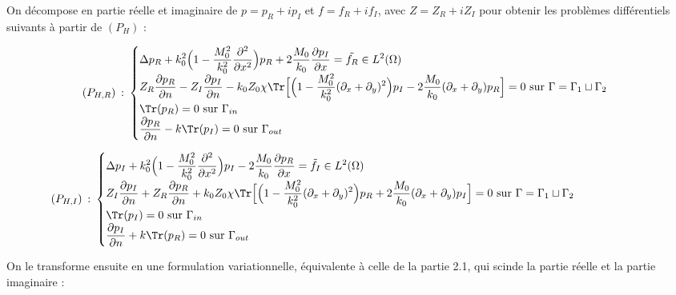 \begin{tcolorbox}[colback=red!5!white,colframe=red!75!black,title=Proposition 6.2.1 : Décomposition du problème différentiel]
On décompose en partie réelle et imaginaire de $p = p_R + ip_I$ et $f = f_R + if_I$, avec $Z=Z_R + iZ_I$ pour obtenir les problèmes différentiels suivants à partir de $(P_H)$ :

\[
    (P_{H,R}) \hspace{2pt} : \hspace{2pt}
    \begin{cases}
    \displaystyle \Delta p_R + k_0^2\Big(1 - \frac{M_0^2}{k_0^2}\frac{\partial^2}{\partial x^2}\Big)p_R+2\frac{M_0}{k_0}\frac{\partial p_I}{\partial x} = \Tilde{f_R} \in L^2(\Omega)\\
    \displaystyle Z_R\frac{\partial p_R}{\partial n} -Z_I\frac{\partial p_I}{\partial n} -k_0Z_0\chi \Tr \Bigl[\Big(1-\frac{M_0^2}{k_0^2}(\partial_x+\partial_y)^2\Big)p_I-2\frac{M_0}{k_0}(\partial_x+\partial_y)p_R \Bigr] = 0$ sur $\Gamma = \Gamma_1 \sqcup \Gamma_2
    \\
    \displaystyle \Tr(p_R) = 0 $ sur $ \Gamma_{in}\\
    \displaystyle \frac{\partial p_R}{\partial n}-k \Tr(p_I) = 0 $ sur $\Gamma_{out}
    \end{cases} 
\]

\[
    (P_{H,I}) \hspace{2pt} : \hspace{2pt}
    \begin{cases}
    \displaystyle \Delta p_I + k_0^2\Big(1 - \frac{M_0^2}{k_0^2}\frac{\partial^2}{\partial x^2}\Big)p_I-2\frac{M_0}{k_0}\frac{\partial p_R}{\partial x} = \Tilde{f_I} \in L^2(\Omega)\\
    \displaystyle Z_I\frac{\partial p_I}{\partial n} +Z_R\frac{\partial p_R}{\partial n} +k_0Z_0\chi \Tr \Bigl[\Big(1-\frac{M_0^2}{k_0^2}(\partial_x+\partial_y)^2\Big)p_R+2\frac{M_0}{k_0}(\partial_x+\partial_y)p_I \Bigr] = 0$ sur $\Gamma = \Gamma_1 \sqcup \Gamma_2 \hspace*{2cm}
    \\
    \displaystyle \Tr(p_I) = 0 $ sur $ \Gamma_{in} \\
    \displaystyle \frac{\partial p_I}{\partial n} + k \Tr(p_R) = 0 $ sur $\Gamma_{out} 
    \end{cases} 
\]
\end{tcolorbox}
On le transforme ensuite en une formulation variationnelle, équivalente à celle de la partie 2.1, qui scinde la partie réelle et la partie imaginaire :

